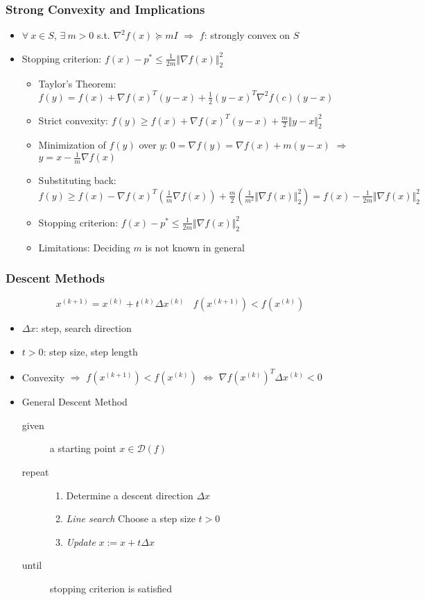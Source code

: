\subsubsection*{Strong Convexity and Implications}
\begin{itemize}
    \item $\forall~x\in S$, $\exists~m>0$ s.t. $\nabla^2 f(x)\succeq mI$ $\Rightarrow$ $f$: strongly convex on $S$
    \item Stopping criterion: $f(x)-p^\ast\leq\frac{1}{2m}\Vert\nabla f(x)\Vert_2^2$
    \begin{itemize}
        \item Taylor's Theorem: $f(y)=f(x)+\nabla f(x)^T(y-x)+\frac{1}{2}(y-x)^T\nabla^2f(c)(y-x)$
        \item Strict convexity: $f(y)\geq f(x)+\nabla f(x)^T(y-x)+\frac{m}{2}\Vert y-x\Vert_2^2$
        \item Minimization of $f(y)$ over $y$: $0=\nabla f(y)=\nabla f(x)+m(y-x)$ $\Rightarrow$ $y=x-\frac{1}{m}\nabla f(x)$
        \item Substituting back: $f(y)\geq f(x)-\nabla f(x)^T\left(\frac{1}{m}\nabla f(x)\right)+\frac{m}{2}\left(\frac{1}{m^2}\Vert\nabla f(x)\Vert_2^2\right)=f(x)-\frac{1}{2m}\Vert\nabla f(x)\Vert_2^2$
        \item Stopping criterion: $f(x)-p^\ast\leq\frac{1}{2m}\Vert\nabla f(x)\Vert_2^2$
        \item Limitations: Deciding $m$ is not known in general
    \end{itemize}
\end{itemize}

\subsubsection*{Descent Methods}
$$ x^{(k+1)}=x^{(k)}+t^{(k)}\Delta x^{(k)}~~~~f(x^{(k+1)})<f(x^{(k)}) $$
\begin{itemize}
    \item $\Delta x$: step, search direction
    \item $t>0$: step size, step length
    \item Convexity $\Rightarrow$ $f(x^{(k+1)})<f(x^{(k)})$ $\Leftrightarrow$ $\nabla f(x^{(k)})^T\Delta x^{(k)}<0$
    \item General Descent Method
    \begin{description}
        \item[given] a starting point $x\in\mathcal{D}(f)$
        \item[repeat] \phantom{}
        \begin{enumerate}
            \item Determine a descent direction $\Delta x$
            \item \textit{Line search} Choose a step size $t>0$
            \item \textit{Update} $x:=x+t\Delta x$
        \end{enumerate}
        \item[until] stopping criterion is satisfied
    \end{description}
\end{itemize}

